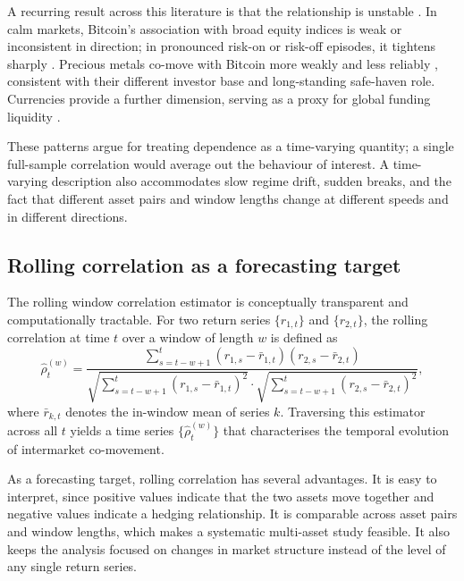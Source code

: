 A recurring result across this literature is that the relationship is unstable \cite{bouri2017hedge, corbet2018exploring}. In calm markets, Bitcoin's association with broad equity indices is weak or inconsistent in direction; in pronounced risk-on or risk-off episodes, it tightens sharply \cite{ji2018network, kristoufek2015main}. Precious metals co-move with Bitcoin more weakly and less reliably \cite{dyhrberg2016bitcoin, klein2018bitcoin}, consistent with their different investor base and long-standing safe-haven role. Currencies provide a further dimension, serving as a proxy for global funding liquidity \cite{corbet2018exploring}.

These patterns argue for treating dependence as a time-varying quantity; a single full-sample correlation would average out the behaviour of interest. A time-varying description also accommodates slow regime drift, sudden breaks, and the fact that different asset pairs and window lengths change at different speeds and in different directions.

\subsection{Rolling correlation as a forecasting target}

The rolling window correlation estimator is conceptually transparent and computationally tractable. For two return series $\{r_{1,t}\}$ and $\{r_{2,t}\}$, the rolling correlation at time $t$ over a window of length $w$ is defined as
\begin{equation}
    \hat{\rho}_{t}^{(w)} = \frac{\sum_{s=t-w+1}^{t}(r_{1,s} - \bar{r}_{1,t})(r_{2,s} - \bar{r}_{2,t})}
    {\sqrt{\sum_{s=t-w+1}^{t}(r_{1,s} - \bar{r}_{1,t})^{2}} \cdot
     \sqrt{\sum_{s=t-w+1}^{t}(r_{2,s} - \bar{r}_{2,t})^{2}}},
\end{equation}
where $\bar{r}_{k,t}$ denotes the in-window mean of series $k$. Traversing this estimator across all $t$ yields a time series $\{\hat{\rho}_{t}^{(w)}\}$ that characterises the temporal evolution of intermarket co-movement.

As a forecasting target, rolling correlation has several advantages. It is easy to interpret, since positive values indicate that the two assets move together and negative values indicate a hedging relationship. It is comparable across asset pairs and window lengths, which makes a systematic multi-asset study feasible. It also keeps the analysis focused on changes in market structure instead of the level of any single return series.


